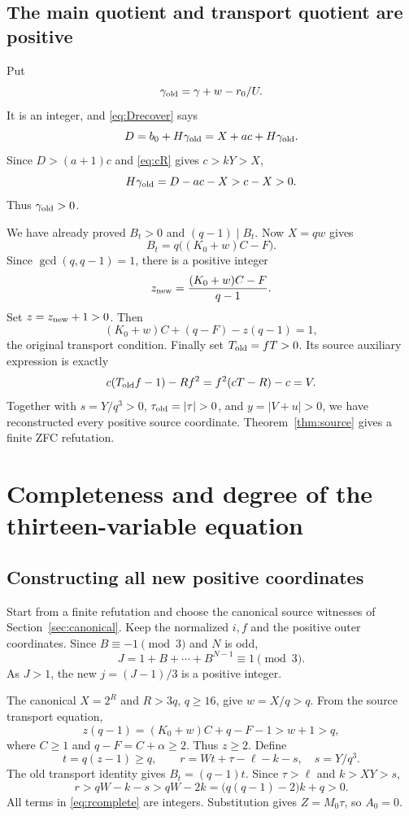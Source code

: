 \documentclass[11pt,a4paper]{article}
\theoremstyle{definition}
\theoremstyle{remark}
\begin{document}
\subsection{The main quotient and transport quotient are positive}

Put
\[
 \gamma_{\rm old}=\gamma+w-r_0/U.
\]
It is an integer, and \eqref{eq:Drecover} says
\[
 D=b_0+H\gamma_{\rm old}=X+ac+H\gamma_{\rm old}.
\]
Since \(D>(a+1)c\) and \eqref{eq:cR} gives \(c>kY>X\),
\[
 H\gamma_{\rm old}=D-ac-X>c-X>0.
\]
Thus \(\gamma_{\rm old}>0\).

We have already proved \(B_t>0\) and \((q-1)\mid B_t\).
Now \(X=qw\) gives
\[
 B_t=q\bigl((K_0+w)C-F\bigr).
\]
Since \(\gcd(q,q-1)=1\), there is a positive integer
\[
 z_{\rm new}=\frac{(K_0+w)C-F}{q-1}.
\]
Set \(z=z_{\rm new}+1>0\). Then
\[
 (K_0+w)C+(q-F)-z(q-1)=1,
\]
the original transport condition. Finally set \(T_{\rm old}=fT>0\).
Its source auxiliary expression is exactly
\[
 c(T_{\rm old}f-1)-Rf^2=f^2(cT-R)-c=V.
\]
Together with \(s=Y/q^3>0\), \(\tau_{\rm old}=|\tau|>0\), and
\(y=|V+u|>0\), we have reconstructed every positive source coordinate.
Theorem~\ref{thm:source} gives a finite ZFC refutation.

\section{Completeness and degree of the thirteen-variable equation}
\label{sec:complete13}

\subsection{Constructing all new positive coordinates}

Start from a finite refutation and choose the canonical source witnesses
of Section~\ref{sec:canonical}. Keep the normalized \(i,f\) and the
positive outer coordinates. Since \(B\equiv-1\pmod3\) and \(N\) is odd,
\[
 J=1+B+\cdots+B^{N-1}\equiv1\pmod3.
\]
As \(J>1\), the new \(j=(J-1)/3\) is a positive integer.

The canonical \(X=2^R\) and \(R>3q\), \(q\ge16\), give
\(w=X/q>q\). From the source transport equation,
\[
 z(q-1)=(K_0+w)C+q-F-1>w+1>q,
\]
where \(C\ge1\) and \(q-F=C+\alpha\ge2\).
Thus \(z\ge2\). Define
\begin{equation}
 t=q(z-1)\ge q,\qquad
 r=Wt+\tau-\ell-k-s,\quad s=Y/q^3.          \label{eq:rcomplete}
\end{equation}
The old transport identity gives \(B_t=(q-1)t\).
Since \(\tau>\ell\) and \(k>XY>s\),
\[
 r>qW-k-s>qW-2k
      =\bigl(q(q-1)-2\bigr)k+q>0.
\]
All terms in \eqref{eq:rcomplete} are integers. Substitution gives
\(Z=M_0\tau\), so \(A_0=0\).
\end{document}
